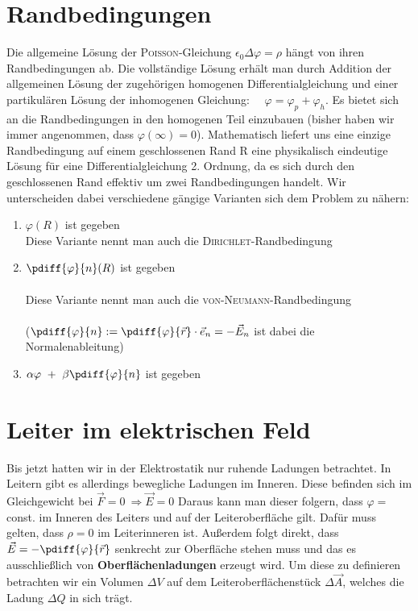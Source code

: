 \section{Randbedingungen}

Die allgemeine Lösung der \textsc{Poisson}-Gleichung $\epsilon_0 \Delta \varphi = \rho$ hängt von ihren Randbedingungen ab. Die vollständige Lösung erhält man durch Addition der allgemeinen Lösung der zugehörigen homogenen Differentialgleichung und einer partikulären Lösung der inhomogenen Gleichung: $\quad \varphi = \varphi_p + \varphi_h$. Es bietet sich an die Randbedingungen in den homogenen Teil einzubauen (bisher haben wir immer angenommen, dass $\varphi (\infty) = 0$). Mathematisch liefert uns eine einzige Randbedingung auf einem geschlossenen Rand R eine physikalisch eindeutige Lösung für eine Differentialgleichung 2. Ordnung, da es sich durch den geschlossenen Rand effektiv um zwei Randbedingungen handelt. Wir unterscheiden dabei verschiedene gängige Varianten sich dem Problem zu nähern:

\begin{enumerate}
\item $\varphi(R)$ ist gegeben\
\\
Diese Variante nennt man auch die \textsc{Dirichlet}-Randbedingung\

\item $\pdiff{\varphi}{n}(R)$ ist gegeben\
\\
\ \\
Diese Variante nennt man auch die \textsc{von-Neumann}-Randbedingung\
\\
\ \\
($\pdiff{\varphi}{n} := \pdiff{\varphi}{\vec{r}}\cdot\vec{e}_n = - \vec{E}_n$ ist dabei die Normalenableitung)\

\item $\alpha \varphi \ + \ \beta\pdiff{\varphi}{n}$ ist gegeben
\end{enumerate}

\section{Leiter im elektrischen Feld}

Bis jetzt hatten wir in der Elektrostatik nur ruhende Ladungen betrachtet. In Leitern  gibt es allerdings bewegliche Ladungen im Inneren. Diese befinden sich im Gleichgewicht bei $\vec{F}=0 \ \Rightarrow \vec{E}= 0$
Daraus kann man dieser folgern, dass $\varphi =$ const. im Inneren des Leiters und auf der Leiteroberfläche gilt. Dafür muss gelten, dass $\rho = 0$ im Leiterinneren ist. Außerdem folgt direkt, dass $\vec{E} = -\pdiff{\varphi}{\vec{r}}$ senkrecht zur Oberfläche stehen muss und das es ausschließlich von \textbf{Oberflächenladungen} erzeugt wird. Um diese zu definieren betrachten wir ein Volumen $\Delta V$ auf dem Leiteroberflächenstück $\Delta \vec{A}$, welches die Ladung $\Delta Q$ in sich trägt.


